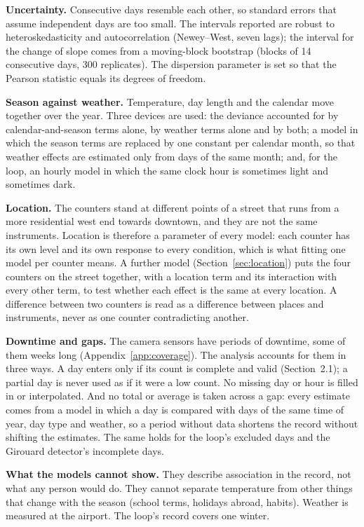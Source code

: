 \documentclass[11pt,a4paper]{article}
\begin{document}
\textbf{Uncertainty.} Consecutive days resemble each other, so standard errors that assume independent days are too small. The intervals reported are robust to heteroskedasticity and autocorrelation (Newey--West, seven lags); the interval for the change of slope comes from a moving-block bootstrap (blocks of 14 consecutive days, 300 replicates). The dispersion parameter is set so that the Pearson statistic equals its degrees of freedom.

\textbf{Season against weather.} Temperature, day length and the calendar move together over the year. Three devices are used: the deviance accounted for by calendar-and-season terms alone, by weather terms alone and by both; a model in which the season terms are replaced by one constant per calendar month, so that weather effects are estimated only from days of the same month; and, for the loop, an hourly model in which the same clock hour is sometimes light and sometimes dark.

\textbf{Location.} The counters stand at different points of a street that runs from a more residential west end towards downtown, and they are not the same instruments. Location is therefore a parameter of every model: each counter has its own level and its own response to every condition, which is what fitting one model per counter means. A further model (Section~\ref{sec:location}) puts the four counters on the street together, with a location term and its interaction with every other term, to test whether each effect is the same at every location. A difference between two counters is read as a difference between places and instruments, never as one counter contradicting another.

\textbf{Downtime and gaps.} The camera sensors have periods of downtime, some of them weeks long (Appendix~\ref{app:coverage}). The analysis accounts for them in three ways. A day enters only if its count is complete and valid (Section~2.1); a partial day is never used as if it were a low count. No missing day or hour is filled in or interpolated. And no total or average is taken across a gap: every estimate comes from a model in which a day is compared with days of the same time of year, day type and weather, so a period without data shortens the record without shifting the estimates. The same holds for the loop\textquoteright{}s excluded days and the Girouard detector\textquoteright{}s incomplete days.

\textbf{What the models cannot show.} They describe association in the record, not what any person would do. They cannot separate temperature from other things that change with the season (school terms, holidays abroad, habits). Weather is measured at the airport. The loop\textquoteright{}s record covers one winter.
\end{document}
